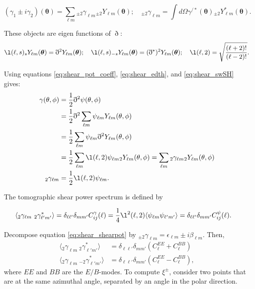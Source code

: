 \begin{equation}
    \label{eq:shear_swSH}
    (\gamma_1 \pm i\gamma_2)(\bm{\theta}) = \sum_{\ell m} {}_{\pm2}\gamma_{\ell m} {}_{\pm2}Y_{\ell m}(\bm{\theta}); \quad _{\pm2}\gamma_{\ell m} = \int d\Omega \gamma^{/*}(\bm{\theta}) {}_{\pm2}Y^*_{\ell m}(\bm{\theta}).
\end{equation}

These objects are eigen functions of $\eth$:
\begin{equation}
    \label{eq:shear_eigen}
    \l(\ell, s){}_{s}Y_{\ell m}(\bm{\theta}) = \eth^2 Y_{\ell m}(\bm{\theta}); \quad \l(\ell, s){}_{-s}Y_{\ell m}(\bm{\theta}) = (\eth^*)^2 Y_{\ell m}(\bm{\theta}); \quad \l(\ell, 2) = \sqrt{\frac{(\ell+2)!}{(\ell-2)!}}.
\end{equation}

Using equations \ref{eq:shear_pot_coeff}, \ref{eq:shear_edth}, and \ref{eq:shear_swSH} gives:
\begin{align}
    \label{eq:shear_shearpot}
    \nonumber \gamma(\theta, \phi) &= \frac{1}{2}\eth^2\psi(\theta, \phi) \\
    \nonumber &= \frac{1}{2}\eth^2 \sum_{\ell m}\psi_{\ell m} Y_{\ell m}(\theta, \phi)\\
    \nonumber &= \frac{1}{2}\sum_{\ell m}\psi_{\ell m} \eth^2  Y_{\ell m}(\theta, \phi) \\ 
    \nonumber &= \frac{1}{2}\sum_{\ell m}\l(\ell, 2) \psi_{\ell m}  {}_{2} Y_{\ell m}(\theta, \phi) = \sum_{\ell m} {}_2\gamma_{\ell m} {}_2 Y_{\ell m}(\theta, \phi) \\
    {}_2\gamma_{\ell m} &= \frac{1}{2} \l(\ell, 2)\psi_{\ell m}.
\end{align}

The tomographic shear power spectrum is defined by

\begin{align}
    \label{eq:shear_shearps}
    \langle{}_2\gamma_{\ell m}~{}_2\gamma^*_{\ell' m'}\rangle &= \delta_{\ell \ell'}\delta_{m m'} C^\gamma_{ij}(\ell)=\frac{1}{4}\l^2(\ell, 2)\langle\psi_{\ell m}\psi_{\ell' m'}\rangle = \delta_{\ell \ell'}\delta_{m m'} C^\psi_{ij}(\ell).
\end{align}

Decompose equation \ref{eq:shear_shearpot} by ${}_{\pm2} \gamma_{\ell m} = \epsilon_{\ell m} \pm i \beta_{\ell m}$. Then,
\begin{align}
    \langle{}_2 \gamma_{\ell m}~ {}_2 \gamma^*_{\ell' m'}\rangle &= \delta_{\ell \ell'} \delta_{m m'} (C^{EE}_\ell + C^{BB}_\ell) \\
    \langle{}_2 \gamma_{\ell m}~ {}_{-2} \gamma^*_{\ell' m'}\rangle &= \delta_{\ell \ell'} \delta_{m m'} (C^{EE}_\ell - C^{BB}_\ell),
\end{align}
where $EE$ and $BB$ are the $E/B$-modes. To compute $\xi^\pm$, consider two points that are at the same azimuthal angle, separated by an angle in the polar direction.

